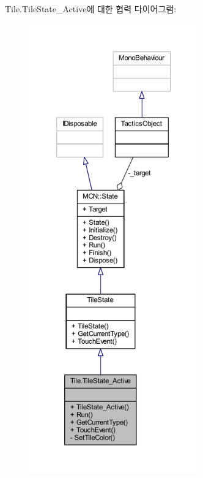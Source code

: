 Tile.\+Tile\+State\+\_\+\+Active에 대한 협력 다이어그램\+:\nopagebreak
\begin{figure}[H]
\begin{center}
\leavevmode
\includegraphics[height=550pt]{class_tile_1_1_tile_state___active__coll__graph}
\end{center}
\end{figure}
